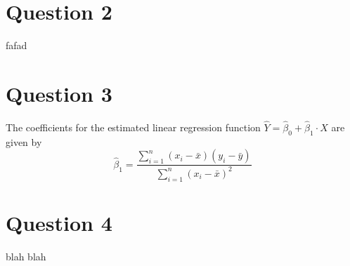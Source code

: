 \documentclass[10pt]{article}
\begin{document}
\section{Question 2} \noindent
fafad

\section{Question 3} \noindent
The coefficients for the estimated linear regression function \(\hat{Y} = \hat{\beta}_0 + \hat{\beta}_1 \cdot X\) are
given by \[\hat{\beta}_1 = \frac{\sum_{i=1}^n (x_i - \bar{x})(y_i - \bar{y})}{\sum_{i=1}^n(x_i - \bar{x})^2}\]

\section{Question 4} \noindent
blah blah
\end{document}

